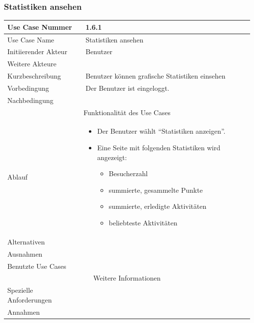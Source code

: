 \documentclass[10pt,a4paper]{article}
\begin{document}
\subsubsection{Statistiken ansehen}
	\begin{tabularx}{\textwidth}{|l|X|}
	\hline Use Case Nummer & 1.6.1\\ 
	\hline Use Case Name & Statistiken ansehen \\ 
	\hline Initiierender Akteur & Benutzer \\
	\hline Weitere Akteure &  \\
	\hline Kurzbeschreibung & Benutzer können grafische Statistiken einsehen \\
	\hline Vorbedingung & Der Benutzer ist eingeloggt. \\
	\hline Nachbedingung &   \\
	\hline \multicolumn{2}{|c|}{Funktionalität des Use Cases}\\
	\hline Ablauf & \begin{itemize}
		\item Der Benutzer wählt ``Statistiken anzeigen''.
		\item Eine Seite mit folgenden Statistiken wird angezeigt:
                      \begin{itemize}
                      \item Besucherzahl
                      \item summierte, gesammelte Punkte
                      \item summierte, erledigte Aktivitäten
                      \item beliebteste Aktivitäten
                      \end{itemize}
		\end{itemize} \\
	\hline Alternativen &  \\
	\hline Ausnahmen & \\
	\hline Benutzte Use Cases & \\
	\hline \multicolumn{2}{|c|}{Weitere Informationen} \\
	\hline Spezielle Anforderungen &  \\
	\hline Annahmen &  \\
	\hline
	\end{tabularx}
\end{document}
